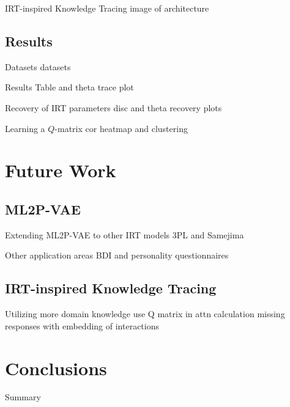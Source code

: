 \documentclass{beamer}
\theoremstyle{definition}
\begin{document}
\begin{frame}{IRT-inspired Knowledge Tracing}
  image of architecture
\end{frame}

\subsection{Results}
\begin{frame}{Datasets}
  datasets
\end{frame}

\begin{frame}{Results}
  Table and theta trace plot
\end{frame}

\begin{frame}{Recovery of IRT parameters}
  disc and theta recovery plots
\end{frame}

\begin{frame}{Learning a $Q$-matrix}
  cor heatmap and clustering
\end{frame}


\section{Future Work}

\subsection{ML2P-VAE}
\begin{frame}{Extending ML2P-VAE to other IRT models}
  3PL and Samejima
\end{frame}

\begin{frame}{Other application areas}
  BDI and personality questionnaires
\end{frame}

\subsection{IRT-inspired Knowledge Tracing}
\begin{frame}{Utilizing more domain knowledge}
  use Q matrix in attn calculation
  missing responses with embedding of interactions
\end{frame}


\section{Conclusions}
\begin{frame}{Summary}
  
\end{frame}
\end{document}
